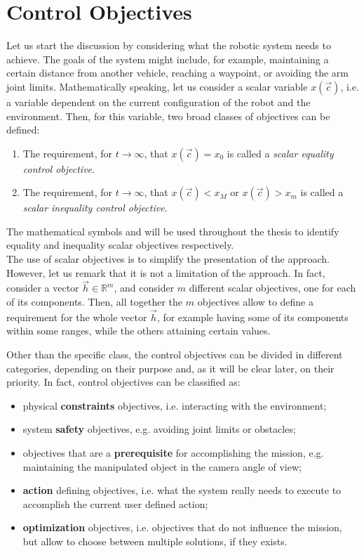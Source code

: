 \section{Control Objectives}\label{sec:objectives}
Let us start the discussion by considering what the robotic system needs to achieve. The goals of the system might include, for example, maintaining a certain distance from another vehicle, reaching a waypoint, or avoiding the arm joint limits. Mathematically speaking, let us consider a scalar variable $x(\vec{c})$, i.e. a variable dependent on the current configuration of the robot and the environment. Then, for this variable, two broad classes of objectives can be defined:%
%
\begin{enumerate}
	\item The requirement, for $t \to \infty$, that $x(\vec{c}) = x_0$ is called a \emph{scalar equality control objective}.
	\item The requirement, for $t \to \infty$, that $x(\vec{c}) < x_M$ or $x(\vec{c}) > x_m$ is called a \emph{scalar inequality control objective}.
\end{enumerate}

The mathematical symbols \bsq{$=$} and \bsq{$\lessgtr$} will be used throughout the thesis to identify equality and inequality scalar objectives respectively.\\
The use of scalar objectives is to simplify the presentation of the approach. However, let us remark that it is not a limitation of the approach. In fact, consider a vector $\vec{h} \in \mathbb{R}^m$, and consider $m$ different scalar objectives, one for each of its components. Then, all together the $m$ objectives allow to define a requirement for the whole vector $\vec{h}$, for example having some of its components within some ranges, while the others attaining certain values.

Other than the specific class, the control objectives can be divided in different categories, depending on their purpose and, as it will be clear later, on their priority. In fact, control objectives can be classified as:
\begin{itemize}
	\item[{\framebox[2.3\width]{\constrTask}}] physical \textbf{constraints} objectives, i.e. interacting with the environment;
	\item[{\framebox[2.3\width]{\safetyTask}}] system \textbf{safety} objectives, e.g. avoiding joint limits or obstacles;
	\item[{\framebox[2.3\width]{\prereqTask}}] objectives that are a \textbf{prerequisite} for accomplishing the mission, e.g. maintaining the manipulated object in the camera angle of view;
	\item[{\framebox[2.3\width]{\actdefTask}}] \textbf{action} defining objectives, i.e. what the system really needs to execute to accomplish the current user defined action;
	\item[{\framebox[2.3\width]{\optimTask}}] \textbf{optimization} objectives, i.e. objectives that do not influence the mission, but allow to choose between multiple solutions, if they exists.
\end{itemize}

